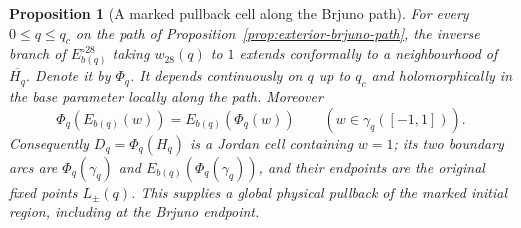 \documentclass[11pt,a4paper]{article}
\newtheorem{proposition}[theorem]{Proposition}
\theoremstyle{definition}
\begin{document}
\begin{proposition}[A marked pullback cell along the Brjuno path]
\label{prop:exterior-pullback-cell}
For every $0\le q\le q_c$ on the path of
Proposition~\ref{prop:exterior-brjuno-path}, the inverse branch of
$E_{b(q)}^{\circ28}$ taking $w_{28}(q)$ to $1$ extends conformally
to a neighbourhood of $\overline{H_q}$.  Denote it by $\Phi_q$.
It depends continuously on $q$ up to $q_c$ and holomorphically in
the base parameter locally along the path.  Moreover
\[
 \Phi_q(E_{b(q)}(w))=E_{b(q)}(\Phi_q(w))
 \qquad(w\in\gamma_q([-1,1])).
\]
Consequently $D_q=\Phi_q(H_q)$ is a Jordan cell containing $w=1$;
its two boundary arcs are $\Phi_q(\gamma_q)$ and
$E_{b(q)}(\Phi_q(\gamma_q))$, and their endpoints are the original
fixed points $L_\pm(q)$.  This supplies a global physical pullback
of the marked initial region, including at the Brjuno endpoint.
\end{proposition}
\end{document}

